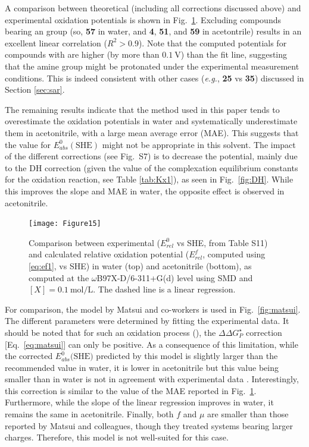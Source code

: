 \documentclass[review,preprint]{elsarticle}
\begin{document}
A comparison between theoretical (including all corrections discussed above) and experimental oxidation potentials is shown in Fig.~\ref{fig:expvstheo}. Excluding compounds bearing an  group (so,  \textbf{57} in water, and \textbf{4}, \textbf{51}, and \textbf{59} in acetontrile) results in an excellent linear correlation ($R^2 > 0.9$). Note that the computed potentials for compounds with  are higher (by more than $\SI{0.1}{\volt}$) than the fit line, suggesting that the amine group might be protonated under the experimental measurement conditions. This is indeed consistent with other cases (\textit{e.g.}, \textbf{25} vs \textbf{35}) discussed in Section \ref{sec:sar}. 

The remaining results indicate that the method used in this paper tends to overestimate the oxidation potentials in water and systematically underestimate them in acetonitrile, with a large mean average error (MAE). This suggests that the value for $E^0_{abs}(\text{SHE})$ might not be appropriate in this solvent. The impact of the different corrections (see Fig.~S7) is to decrease the potential, mainly due to the DH correction (given the value of the complexation equilibrium constants for the oxidation reaction, see Table \ref{tab:Kx1}), as seen in Fig.~\ref{fig:DH}. While this improves the slope and MAE in water, the opposite effect is observed in acetonitrile.

\begin{figure}[!h]
	\centering
	\texttt{[image: Figure15]}
	\caption{Comparison between experimental ($E^0_{rel} $ vs SHE, from Table S11) and  calculated relative oxidation potential ($E^f_{rel}$, computed using \eqref{eq:ef1}, vs SHE) in water (top) and acetonitrile (bottom), as computed at the $\omega$B97X-D/6-311+G(d) level using SMD and $[X]=\SI{0.1}{\mole\per\liter}$.  The dashed line is a linear regression.}
	\label{fig:expvstheo}
\end{figure}

For comparison, the model by Matsui and co-workers \cite{matsuiDensityFunctionalTheory2013} is used in Fig.~\ref{fig:matsui}. The different parameters were determined by fitting the experimental data. It should be noted that for such an oxidation process (), the $\Delta\Delta G^\star_P$ correction [Eq.~\eqref{eq:matsui}] can only be positive. As a consequence of this limitation, while the corrected $E^0_{abs}(\text{SHE)}$  predicted by this model is slightly larger than the recommended value in water, it is lower in acetonitrile but this value being smaller than in water is not in agreement with experimental data \cite{marenichComputationalElectrochemistryPrediction2014}. Interestingly, this correction is similar to the value of the MAE reported in Fig.~\ref{fig:expvstheo}. Furthermore, while the slope of the linear regression improves in water, it remains the same in acetonitrile. Finally, both $f$ and $\mu$ are smaller than those reported by Matsui and colleagues, though they treated systems bearing larger charges. Therefore, this model is not well-suited for this case.
\end{document}
